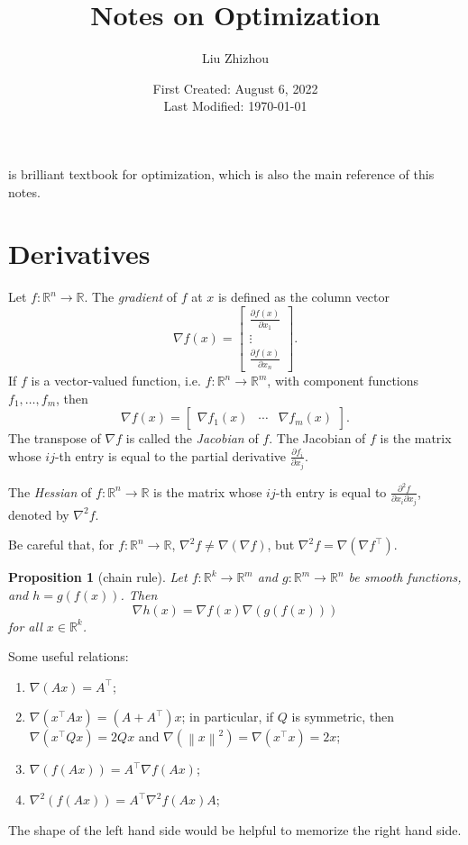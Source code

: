 \documentclass[12pt,a4paper]{article}
\title{Notes on Optimization}
\author{Liu Zhizhou}
\date{First Created: August 6, 2022\\
	Last Modified: \today}
\numberwithin{equation}{section}
\theoremstyle{mystyle}
\newtheorem{proposition}[definition]{Proposition}
\newcommand{\R}{\mathbb{R}}
\newcommand{\grad}{\nabla}
\newcommand{\T}{\top}
\newcommand{\norm}[1]{\left\lVert #1 \right\rVert}
\begin{document}
	{\sffamily \maketitle}
	
	\cite{Bertsekas/99} is brilliant textbook for optimization, which is also the main reference of this notes.
	
	\tableofcontents

	\section{Derivatives}
	Let $f:\R^n \to \R$. The \emph{gradient} of $f$ at $x$ is defined as the column vector
	$$
	\grad f(x)=
	\begin{bmatrix}
		\frac{\partial f(x)}{\partial x_1}\\
		\vdots\\
		\frac{\partial f(x)}{\partial x_n}
	\end{bmatrix}.
	$$
	If $f$ is a vector-valued function, i.e. $f:\R^n\to \R^m$, with component functions $f_1,\dots,f_m$, then
	$$
	\grad f(x)=
	\begin{bmatrix}
		\grad f_1(x) & \cdots & \grad f_m(x)
	\end{bmatrix}.
	$$
	The transpose of $\grad f$ is called the \emph{Jacobian} of $f$. The Jacobian of $f$ is the matrix whose $ij$-th entry is equal to the partial derivative $\frac{\partial f_i}{\partial x_j}$.
	
	The \emph{Hessian} of $f:\R^n\to \R$ is the matrix whose $ij$-th entry is equal to $\frac{\partial^2 f}{\partial x_i \partial x_j}$, denoted by $\grad^2 f$.
	
	Be careful that, for $f:\R^n \to \R$, $\grad^2 f\neq \grad(\grad f)$, but $\grad^2 f = \grad(\grad f^\T)$.
	\begin{proposition}[chain rule]
		Let $f:\R^k\to \R^m$ and $g:\R^m\to\R^n$ be smooth functions, and $h=g(f(x))$. Then
		$$
		\grad h(x) = \grad f(x)\grad(g(f(x)))
		$$
		for all $x\in \R^k$.
	\end{proposition}
	Some useful relations:
	\begin{enumerate}
		\item $\grad (Ax)=A^\T$;
		\item $\grad (x^\T A x)=(A+A^\T)x$; in particular, if $Q$ is symmetric, then $\grad(x^\T Q x)=2Qx$ and $\grad(\norm{x}^2)=\grad(x^\T x)=2x$;
		\item $\grad(f(Ax))=A^\T \grad f(Ax)$;
		\item $\grad^2(f(Ax))=A^\T \grad^2 f(Ax)A$;
	\end{enumerate}
	The shape of the left hand side would be helpful to memorize the right hand side.
	
\end{document}
